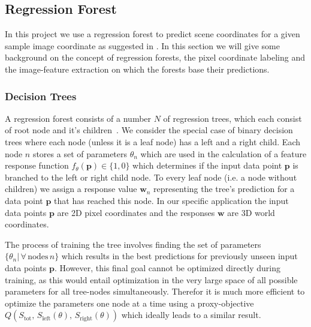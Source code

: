 \documentclass[final]{cvpr}
\begin{document}
\subsection{Regression Forest}

In this project we use a regression forest to predict scene coordinates for a given
sample image coordinate as suggested in \cite{shotton2013}. In this section we will
give some background on the concept of regression forests, the pixel coordinate
labeling and the image-feature extraction on which the forests base their predictions.\\

\subsubsection{Decision Trees}
A regression forest consists of a number $N$ of regression trees, which each consist 
of root node and it's children~\cite{Criminisi2013}. We consider the special case of binary decision trees
where each node (unless it is a leaf node) has a left and a right child. Each node $n$
stores a set of parameters $\theta_n$ which are used in the calculation of a
feature response function $f_{\theta}(\boldsymbol{p}) \in \{1, 0\}$ which determines if the input
data point $\boldsymbol{p}$ is branched to the left or right child node. To every leaf node
(i.e. a node without children) we assign a response value $\boldsymbol{w}_n$ representing
the tree's prediction for a data point $\boldsymbol{p}$ that has reached this node. In our
specific application the input data points $\boldsymbol{p}$ are 2D pixel coordinates and the
responses $\boldsymbol{w}$ are 3D world coordinates.

The process of training the tree involves finding the set of parameters
$\{\theta_n | \, \forall \, \text{nodes} \, n\}$ which results in the best predictions
for previously unseen input data points $\boldsymbol{p}$. However, this final goal cannot
be optimized directly during training, as this would entail optimization in the
very large space of all possible parameters for all tree-nodes simultaneously. Therefor
it is much more efficient to optimize the parameters one node at a time using a
proxy-objective $Q(S_{\text{tot}},\, S_{\text{left}}(\theta),\, S_{\text{right}}(\theta))$
which ideally leads to a similar result.
\end{document}

